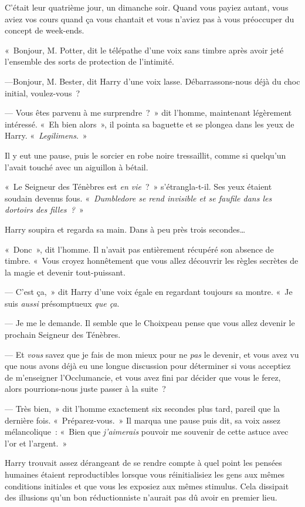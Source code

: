 C'était leur quatrième jour, un dimanche soir. Quand vous payiez autant, vous aviez vos cours quand ça vous chantait et vous n'aviez pas à vous préoccuper du concept de week-ends.

«~Bonjour, M. Potter, dit le télépathe d'une voix sans timbre après avoir jeté l'ensemble des sorts de protection de l'intimité.

---Bonjour, M. Bester, dit Harry d'une voix lasse. Débarrassons-nous déjà du choc initial, voulez-vous~?

--- Vous êtes parvenu à me surprendre~?~» dit l'homme, maintenant légèrement intéressé. «~Eh bien alors~», il pointa sa baguette et se plongea dans les yeux de Harry. «~\emph{Legilimens}.~»

Il y eut une pause, puis le sorcier en robe noire tressaillit, comme si quelqu'un l'avait touché avec un aiguillon à bétail.

«~Le Seigneur des Ténèbres est \emph{en vie}~?~» s'étrangla-t-il. Ses yeux étaient soudain devenus fous. «~\emph{Dumbledore se rend invisible et se faufile dans les dortoirs des filles~?}~»

Harry soupira et regarda sa main. Dans à peu près trois secondes…

«~Donc~», dit l'homme. Il n'avait pas entièrement récupéré son absence de timbre. «~Vous croyez honnêtement que vous allez découvrir les règles secrètes de la magie et devenir tout-puissant.

--- C'est ça,~» dit Harry d'une voix égale en regardant toujours sa montre. «~Je suis \emph{aussi} présomptueux \emph{que ça}.

--- Je me le demande. Il semble que le Choixpeau pense que vous allez devenir le prochain Seigneur des Ténèbres.

--- Et \emph{vous} savez que je fais de mon mieux pour ne \emph{pas} le devenir, et vous avez vu que nous avons déjà eu une longue discussion pour déterminer si vous acceptiez de m'enseigner l'Occlumancie, et vous avez fini par décider que vous le ferez, alors pourrions-nous juste passer à la suite~?

--- Très bien,~» dit l'homme exactement six secondes plus tard, pareil que la dernière fois. «~Préparez-vous.~» Il marqua une pause puis dit, sa voix assez mélancolique~: «~Bien que \emph{j'aimerais} pouvoir me souvenir de cette astuce avec l'or et l'argent.~»

Harry trouvait assez dérangeant de se rendre compte à quel point les pensées humaines étaient reproductibles lorsque vous réinitialisiez les gens aux mêmes conditions initiales et que vous les exposiez aux mêmes stimulus. Cela dissipait des illusions qu'un bon réductionniste n'aurait pas dû avoir en premier lieu.

